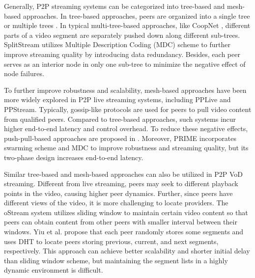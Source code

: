 Generally, P2P streaming systems can be categorized into tree-based
and mesh-based approaches. In tree-based approaches, peers are
organized into a single tree \cite{jannotti:overcast, chu:narada}
or multiple trees \cite{castro:splitstream,
padmanabhan:coopnet}.
In typical multi-tree-based
approaches, like CoopNet \cite{padmanabhan:coopnet}, different parts of a video segment are
separately pushed down along different sub-trees. SplitStream
\cite{castro:splitstream}
utilizes Multiple Description Coding (MDC) scheme to further improve
streaming quality by introducing data redundancy. Besides, each peer
serves as an interior node in only one sub-tree to minimize the
negative effect of node failures. 

To further improve robustness and scalability, mesh-based approaches
have been more widely explored in P2P live streaming systems,
including PPLive and PPStream. Typically, gossip-like protocols are
used for peers to pull video content from qualified peers. Compared to
tree-based approaches, such systems incur higher end-to-end latency
and control overhead. To reduce these negative effects,
push-pull-based approaches are proposed in \cite{zhang:coolstreaming}. 
Moreover, PRIME \cite{magharei:prime}
incorporates swarming scheme and MDC to improve robustness and
streaming quality, but its two-phase design increases end-to-end
latency.

Similar tree-based and mesh-based approaches can also be utilized in
P2P VoD streaming. Different from live streaming, peers
may seek to different playback points in the video, causing
higher peer dynamics. 
Further, since peers have different views of the video, it is more challenging
to locate providers. The oStream \cite{cui:ostream} system
utilizes sliding window to maintain certain video content so that
peers can obtain content from other peers with smaller interval
between their windows. Yiu et al. \cite{yiu:distributed} propose that
each peer randomly stores some segments and uses DHT to locate peers
storing previous, current, and next segments, respectively. This
approach can achieve better scalability and shorter initial delay than
sliding window scheme, but maintaining the segment
lists in a highly dynamic environment is difficult.


